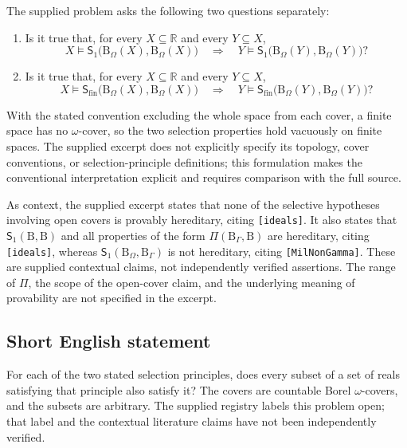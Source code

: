 \documentclass[11pt]{article}
\newcommand{\R}{\mathbb{R}}
\begin{document}
The supplied problem asks the following two questions separately:
\begin{enumerate}
\item Is it true that, for every \(X\subseteq\R\) and every \(Y\subseteq X\),
\[
 X\models\mathsf S_1\bigl(\mathrm B_\Omega(X),\mathrm B_\Omega(X)\bigr)
 \quad\Longrightarrow\quad
 Y\models\mathsf S_1\bigl(\mathrm B_\Omega(Y),\mathrm B_\Omega(Y)\bigr)?
\]
\item Is it true that, for every \(X\subseteq\R\) and every \(Y\subseteq X\),
\[
 X\models\mathsf S_{\mathrm{fin}}\bigl(\mathrm B_\Omega(X),\mathrm B_\Omega(X)\bigr)
 \quad\Longrightarrow\quad
 Y\models\mathsf S_{\mathrm{fin}}\bigl(\mathrm B_\Omega(Y),\mathrm B_\Omega(Y)\bigr)?
\]
\end{enumerate}
With the stated convention excluding the whole space from each cover, a finite space has no \(\omega\)-cover, so the two selection properties hold vacuously on finite spaces. The supplied excerpt does not explicitly specify its topology, cover conventions, or selection-principle definitions; this formulation makes the conventional interpretation explicit and requires comparison with the full source.

As context, the supplied excerpt states that none of the selective hypotheses involving open covers is provably hereditary, citing \texttt{[ideals]}. It also states that \(\mathsf S_1(\mathrm B,\mathrm B)\) and all properties of the form \(\Pi(\mathrm B_\Gamma,\mathrm B)\) are hereditary, citing \texttt{[ideals]}, whereas \(\mathsf S_1(\mathrm B_\Omega,\mathrm B_\Gamma)\) is not hereditary, citing \texttt{[MilNonGamma]}. These are supplied contextual claims, not independently verified assertions. The range of \(\Pi\), the scope of the open-cover claim, and the underlying meaning of provability are not specified in the excerpt.
\subsection{Short English statement}
For each of the two stated selection principles, does every subset of a set of reals satisfying that principle also satisfy it? The covers are countable Borel \(\omega\)-covers, and the subsets are arbitrary. The supplied registry labels this problem open; that label and the contextual literature claims have not been independently verified.
\end{document}
